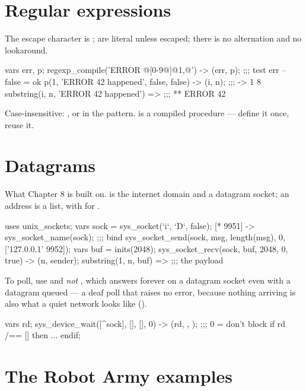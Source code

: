 \section{Regular expressions}

The escape character is ;  are literal unless
escaped; there is no alternation and no lookaround.

\begin{pop}
vars err, p;
regexp_compile('ERROR @[0-9@]@{1,@}') -> (err, p);   ;;; test err -- false = ok
p(1, 'ERROR 42 happened', false, false) -> (i, n);   ;;; -> 1  8
substring(i, n, 'ERROR 42 happened') =>              ;;; ** ERROR 42
\end{pop}

Case-insensitive: , or  in the
pattern.  is a compiled procedure --- define it once, reuse it.

\section{Datagrams}

What Chapter 8 is built on.   is the internet domain and
 a datagram socket; an address is a list, with \code{*} for
.

\begin{pop}
uses unix_sockets;
vars sock = sys_socket(`i`, `D`, false);
[* 9951] -> sys_socket_name(sock);                 ;;; bind
sys_socket_send(sock, msg, length(msg), 0, ['127.0.0.1' 9952]);
vars buf = inits(2048);
sys_socket_recv(sock, buf, 2048, 0, true) -> (n, sender);
substring(1, n, buf) =>                            ;;; the payload
\end{pop}

To poll, use  and \emph{not}
, which answers  forever on a
datagram socket even with a datagram queued --- a deaf poll that raises no
error, because nothing arriving is also what a quiet network looks like
().

\begin{pop}
vars rd;
sys_device_wait([^sock], [], [], 0) -> (rd, , );    ;;; 0 = don't block
if rd /== [] then ... endif;
\end{pop}

\section{The Robot Army examples}

